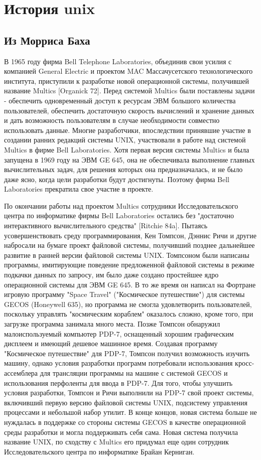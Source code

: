 \chapter {История unix}
\section{Из Морриса Баха}
    В  1965  году фирма Bell Telephone Laboratories, объединив свои усилия с компанией General Electric и проектом MAC  Массачусетского  технологического института,  приступили  к  разработке новой операционной системы, получившей название Multics [Organick 72]. Перед системой Multics были поставлены задачи - обеспечить одновременный доступ  к  ресурсам  ЭВМ  большого  количества пользователей,  обеспечить достаточную скорость вычислений и хранение данных и дать возможность пользователям в случае необходимости совместно  использовать  данные. Многие разработчики, впоследствии принявшие участие в создании ранних редакций системы UNIX, участвовали в работе над  системой  Multics  в фирме  Bell Laboratories. Хотя первая версия системы Multics и была запущена в 1969 году на ЭВМ GE 645, она не обеспечивала выполнение  главных  вычислительных задач, для решения которых она предназначалась, и не было даже ясно, когда  цели  разработки  будут  достигнуты.  Поэтому фирма Bell Laboratories прекратила свое участие в проекте.
    
    По окончании работы над проектом Multics  сотрудники  Исследовательского центра по информатике фирмы Bell Laboratories остались без "достаточно интерактивного  вычислительного  средства" [Ritchie 84a]. Пытаясь усовершенствовать среду программирования, Кен Томпсон, Дэннис Ричи и другие набросали  на бумаге  проект  файловой  системы,  получивший позднее дальнейшее развитие в ранней версии файловой системы UNIX. Томпсоном были написаны программы, имитирующие поведение предложенной файловой системы в режиме подкачки данных по запросу, им было даже создано простейшее ядро операционной системы  для  ЭВМ GE  645.  В  то  же  время  он  написал на Фортране игровую программу "Space Travel" ("Космическое путешествие") для системы GECOS  (Honeywell  635),  но программа не смогла удовлетворить пользователей, поскольку управлять "космическим  кораблем" оказалось сложно, кроме того, при загрузке программа занимала много места. Позже Томпсон обнаружил малоиспользуемый компьютер  PDP-7, оснащенный  хорошим  графическим  дисплеем и имеющий дешевое машинное время.
Создавая программу "Космическое путешествие" для PDP-7, Томпсон получил возможность изучить машину, однако условия разработки программ потребовали  использования  кросс-ассемблера  для трансляции программы на машине с системой GECOS и использования перфоленты для ввода в PDP-7. Для того, чтобы улучшить условия разработки, Томпсон и Ричи выполнили на PDP-7 свой  проект  системы, включивший  первую  версию файловой системы UNIX, подсистему управления процессами и небольшой набор утилит. В конце концов, новая  система  больше  не нуждалась в поддержке со стороны системы GECOS в качестве операционной среды разработки  и  могла поддерживать себя сама. Новая система получила название UNIX, по сходству с Multics его придумал еще один  сотрудник  Исследовательского центра по информатике Брайан Керниган.

